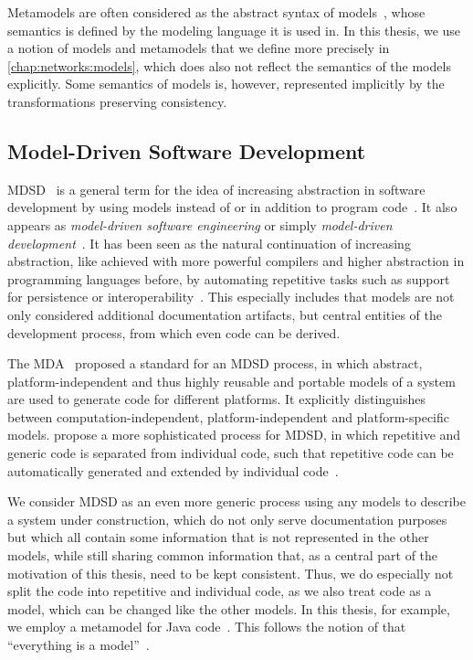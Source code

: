 Metamodels are often considered as the abstract syntax of models~\cite[p.~27]{voelter2013DslEngineering}, whose semantics is defined by the modeling language it is used in.
In this thesis, we use a notion of models and metamodels that we define more precisely in \autoref{chap:networks:models}, which does also not reflect the semantics of the models explicitly.
Some semantics of models is, however, represented implicitly by the transformations preserving consistency.


\subsection{Model-Driven Software Development}
\label{chap:foundations:modeling:mdsd}

\gls{MDSD}~\cite{stahl2006a} is a general term for the idea of increasing abstraction in software development by using models instead of or in addition to program code~\cite{atkinson2003mdd-Software}.
It also appears as \emph{model-driven software engineering} or simply \emph{model-driven development}~\cite{atkinson2003mdd-Software}.
It has been seen as the natural continuation of increasing abstraction, like achieved with more powerful compilers and higher abstraction in programming languages before, by automating repetitive tasks such as support for persistence or interoperability~\cite{atkinson2003mdd-Software}.
This especially includes that models are not only considered additional documentation artifacts, but central entities of the development process, from which even code can be derived.

The \gls{MDA}~\cite{mda} proposed a standard for an \gls{MDSD} process, in which abstract, platform-independent and thus highly reusable and portable models of a system are used to generate code for different platforms.
It explicitly distinguishes between computation-independent, platform-independent and platform-specific models.
\citeauthor{voelter2013mdsd-Book} propose a more sophisticated process for \gls{MDSD}, in which repetitive and generic code is separated from individual code, such that repetitive code can be automatically generated and extended by individual code~\cite[Fig.~2.1]{voelter2013mdsd-Book}.

We consider \gls{MDSD} as an even more generic process using any models to describe a system under construction, which do not only serve documentation purposes but which all contain some information that is not represented in the other models, while still sharing common information that, as a central part of the motivation of this thesis, need to be kept consistent.
Thus, we do especially not split the code into repetitive and individual code, as we also treat code as a model, which can be changed like the other models.
In this thesis, for example, we employ a metamodel for Java code~\cite{heidenreich2010jamopp-SLE}.
This follows the notion of \citeauthor{bezivin2005sosym} that \enquote{everything is a model}~\cite{bezivin2005sosym}.



